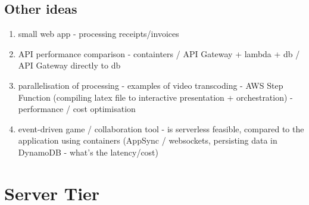 


\subsection{Other ideas}

\begin{enumerate}
    \item small web app - processing receipts/invoices
    \item API performance comparison - containters / API Gateway + lambda + db / API Gateway directly to db
    \item parallelisation of processing - examples of video transcoding - AWS Step Function (compiling latex file to interactive presentation + orchestration) - performance / cost optimisation
    \item event-driven game / collaboration tool - is serverless feasible, compared to the application using containers (AppSync / websockets, persisting data in DynamoDB - what's the latency/cost)
\end{enumerate}



\section{Server Tier}

